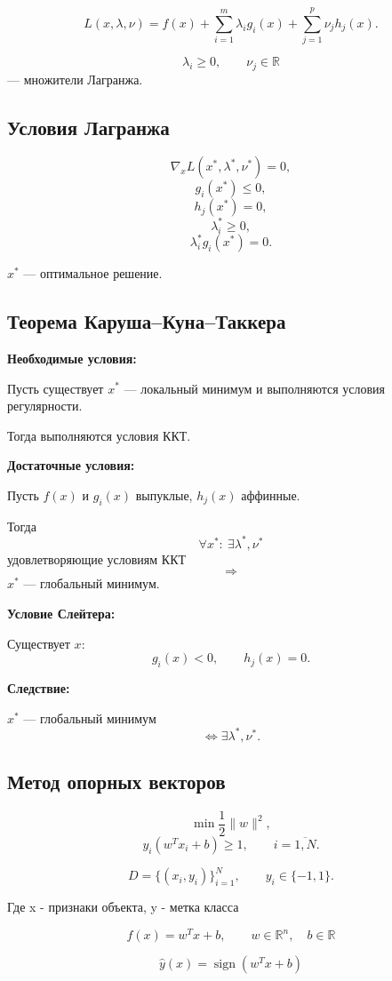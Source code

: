 \documentclass[12pt,a4paper]{article}
\begin{document}
\[
L(x,\lambda,\nu)
=
f(x)
+
\sum_{i=1}^{m}\lambda_i g_i(x)
+
\sum_{j=1}^{p}\nu_j h_j(x).
\]

\[
\lambda_i\geq 0,\qquad \nu_j\in\mathbb{R}
\]
--- множители Лагранжа.

\subsection{Условия Лагранжа}

\[
\nabla_x L(x^*,\lambda^*,\nu^*)=0,
\]
\[
g_i(x^*)\leq 0,
\]
\[
h_j(x^*)=0,
\]
\[
\lambda_i^*\geq 0,
\]
\[
\lambda_i^*g_i(x^*)=0.
\]

$x^*$ --- оптимальное решение.

\subsection{Теорема Каруша--Куна--Таккера}

\textbf{Необходимые условия:}

Пусть существует $x^*$ --- локальный минимум и выполняются условия регулярности.

Тогда выполняются условия ККТ.

\textbf{Достаточные условия:}

Пусть $f(x)$ и $g_i(x)$ выпуклые, $h_j(x)$ аффинные.

Тогда
\[
\forall x^*:\ \exists \lambda^*,\nu^*
\]
удовлетворяющие условиям ККТ
\[
\Longrightarrow
\]
$x^*$ --- глобальный минимум.

\textbf{Условие Слейтера:}

Существует $x$:
\[
g_i(x)<0,\qquad h_j(x)=0.
\]

\textbf{Следствие:}

$x^*$ --- глобальный минимум
\[
\Longleftrightarrow
\exists \lambda^*,\nu^*.
\]

\subsection{Метод опорных векторов}

\[
\min \frac{1}{2}\|w\|^2,
\]
\[
y_i(w^Tx_i+b)\geq 1,\qquad i=\overline{1,N}.
\]

\[
D=\{(x_i,y_i)\}_{i=1}^N,
\qquad
y_i\in\{-1,1\}.
\]

Где x - признаки объекта, y - метка класса

\[
f(x)=w^Tx+b,
\qquad
w\in\mathbb{R}^n,\quad b\in\mathbb{R}
\]

\[
\hat y(x)=\operatorname{sign}(w^Tx+b)
\]
\end{document}
